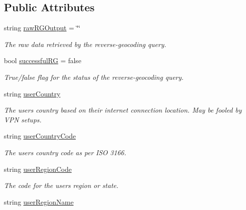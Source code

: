 \subsection*{Public Attributes}
\begin{DoxyCompactItemize}
\item 
string \mbox{\hyperlink{class_bigfoot_d_s_1_1_bigfoot_general_location_finder_a76a67a66c34a490534022973b6ef8622}{raw\+R\+G\+Output}} = \char`\"{}\char`\"{}
\begin{DoxyCompactList}\small\item\em The raw data retrieved by the reverse-\/geocoding query. \end{DoxyCompactList}\item 
bool \mbox{\hyperlink{class_bigfoot_d_s_1_1_bigfoot_general_location_finder_a47dbb50a676cb53063ab0f648c93fc76}{successful\+RG}} = false
\begin{DoxyCompactList}\small\item\em True/false flag for the status of the reverse-\/geocoding query. \end{DoxyCompactList}\item 
string \mbox{\hyperlink{class_bigfoot_d_s_1_1_bigfoot_general_location_finder_a931f428edd0031ddf186903f148dd0a6}{user\+Country}}
\begin{DoxyCompactList}\small\item\em The user\textquotesingle{}s country based on their internet connection location. May be fooled by V\+PN setups. \end{DoxyCompactList}\item 
string \mbox{\hyperlink{class_bigfoot_d_s_1_1_bigfoot_general_location_finder_afe145b5b61a9f2a05493961ad7841e75}{user\+Country\+Code}}
\begin{DoxyCompactList}\small\item\em The user\textquotesingle{}s country code as per I\+SO 3166. \end{DoxyCompactList}\item 
string \mbox{\hyperlink{class_bigfoot_d_s_1_1_bigfoot_general_location_finder_a88c8886f1d052a9639468b53cba80eb1}{user\+Region\+Code}}
\begin{DoxyCompactList}\small\item\em The code for the user\textquotesingle{}s region or state. \end{DoxyCompactList}\item 
string \mbox{\hyperlink{class_bigfoot_d_s_1_1_bigfoot_general_location_finder_a0f4adca126c63bc34800d2d8a511ba87}{user\+Region\+Name}}

\end{DoxyCompactItemize}
